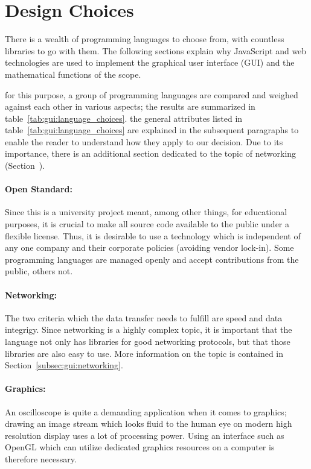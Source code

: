 \section{Design Choices} %
\label{sec:gui:design_choices}

There is  a wealth  of programming  languages to  choose from,  with countless
libraries to go  with them. The following sections explain  why JavaScript and
web technologies are used to implement  the graphical user interface (GUI) and
the mathematical functions of the scope. 

for  this  purpose,  a  group   of  programming  languages  are  compared  and
weighed  against each  other in  various aspects;  the results  are summarized
in   table~\ref{tab:gui:language_choices}.  the   general  attributes   listed
in  table~\ref{tab:gui:language_choices}  are   explained  in  the  subsequent
paragraphs to enable the reader to  understand how they apply to our decision.
Due to its  importance, there is an additional section  dedicated to the topic
of networking (Section~\label{subsec:gui:networking}).

\paragraph{Open  Standard:} Since this  is a  university project  meant, among
other things, for educational purposes, it  is crucial to make all source code
available to the public under a flexible license. Thus, it is desirable to use
a  technology which  is independent  of any  one company  and their  corporate
policies  (avoiding vendor  lock-in). Some programming  languages are  managed
openly and accept contributions from the public, others not.

\paragraph{Networking:} The  two criteria  which  the data  transfer needs  to
fulfill are  speed and data integrigy.   Since networking is a  highly complex
topic,  it is  important that  the language  not only  has libraries  for good
networking  protocols, but  that those  libraries are  also easy  to use. More
information on the topic is contained in Section~\ref{subsec:gui:networking}.

\paragraph{Graphics:} An oscilloscope is quite a demanding application when it
comes to graphics; drawing an image stream  which looks fluid to the human eye
on modern  high resolution display  uses a  lot of processing  power. Using an
interface such as  OpenGL which can utilize dedicated graphics  resources on a
computer is therefore necessary.

